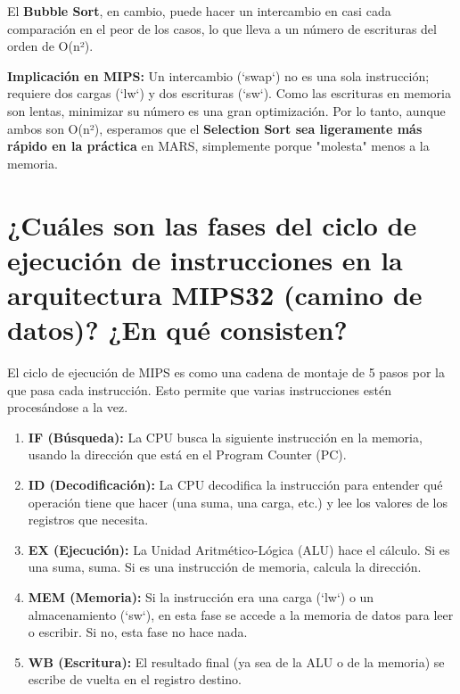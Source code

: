 \documentclass{article}
\begin{document}
\noindent El \textbf{Bubble Sort}, en cambio, puede hacer un intercambio en casi cada comparación en el peor de los casos, lo que lleva a un número de escrituras del orden de O(n²).\newline

\noindent \textbf{Implicación en MIPS:} Un intercambio (`swap`) no es una sola instrucción; requiere dos cargas (`lw`) y dos escrituras (`sw`). Como las escrituras en memoria son lentas, minimizar su número es una gran optimización. Por lo tanto, aunque ambos son O(n²), esperamos que el \textbf{Selection Sort sea ligeramente más rápido en la práctica} en MARS, simplemente porque "molesta" menos a la memoria.

\section{¿Cuáles son las fases del ciclo de ejecución de instrucciones en la arquitectura MIPS32 (camino de datos)? ¿En qué consisten?}
\indent\indent El ciclo de ejecución de MIPS es como una cadena de montaje de 5 pasos por la que pasa cada instrucción. Esto permite que varias instrucciones estén procesándose a la vez.
\begin{enumerate}
    \item \textbf{IF (Búsqueda):} La CPU busca la siguiente instrucción en la memoria, usando la dirección que está en el Program Counter (PC).
    \item \textbf{ID (Decodificación):} La CPU decodifica la instrucción para entender qué operación tiene que hacer (una suma, una carga, etc.) y lee los valores de los registros que necesita.
    \item \textbf{EX (Ejecución):} La Unidad Aritmético-Lógica (ALU) hace el cálculo. Si es una suma, suma. Si es una instrucción de memoria, calcula la dirección.
    \item \textbf{MEM (Memoria):} Si la instrucción era una carga (`lw`) o un almacenamiento (`sw`), en esta fase se accede a la memoria de datos para leer o escribir. Si no, esta fase no hace nada.
    \item \textbf{WB (Escritura):} El resultado final (ya sea de la ALU o de la memoria) se escribe de vuelta en el registro destino.
\end{enumerate}
\end{document}
